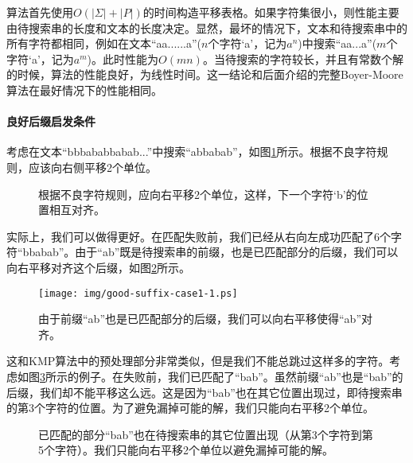 \documentclass[UTF8]{article}
\begin{document}
算法首先使用$O(|\Sigma| + |P|)$的时间构造平移表格。如果字符集很小，则性能主要由待搜索串的长度和文本的长度决定。显然，最坏的情况下，文本和待搜索串中的所有字符都相同，例如在文本“aa......a”($n$个字符‘a’，记为$a^n$)中搜索“aa...a”($m$个字符‘a’，记为$a^m$)。此时性能为$O(mn)$。当待搜索的字符较长，并且有常数个解的时候，算法的性能良好，为线性时间。这一结论和后面介绍的完整Boyer-Moore算法在最好情况下的性能相同。

\paragraph{良好后缀启发条件}

考虑在文本“bbbababbabab...”中搜索“abbabab”，如图\ref{fig:bad-char-2}所示。根据不良字符规则，应该向右侧平移2个单位。

\begin{figure}[htbp]
 \centering
 \caption{根据不良字符规则，应向右平移2个单位，这样，下一个字符‘b’的位置相互对齐。}
 \label{fig:bad-char-2}
\end{figure}

实际上，我们可以做得更好。在匹配失败前，我们已经从右向左成功匹配了6个字符“bbabab”。由于“ab”既是待搜索串的前缀，也是已匹配部分的后缀，我们可以向右平移对齐这个后缀，如图\ref{fig:good-suffix-case1-1}所示。

\begin{figure}[htbp]
 \centering
 \texttt{[image: img/good-suffix-case1-1.ps]}
 \caption{由于前缀“ab”也是已匹配部分的后缀，我们可以向右平移使得“ab”对齐。}
 \label{fig:good-suffix-case1-1}
\end{figure}

这和KMP算法中的预处理部分非常类似，但是我们不能总跳过这样多的字符。考虑如图\ref{fig:good-suffix-case2-1}所示的例子。在失败前，我们已匹配了“bab”。虽然前缀“ab”也是“bab”的后缀，我们却不能平移这么远。这是因为“bab”也在其它位置出现过，即待搜索串的第3个字符的位置。为了避免漏掉可能的解，我们只能向右平移2个单位。

\begin{figure}[htbp]
 \centering
 \caption{已匹配的部分“bab”也在待搜索串的其它位置出现（从第3个字符到第5个字符）。我们只能向右平移2个单位以避免漏掉可能的解。}
 \label{fig:good-suffix-case2-1}
\end{figure}
\end{document}
